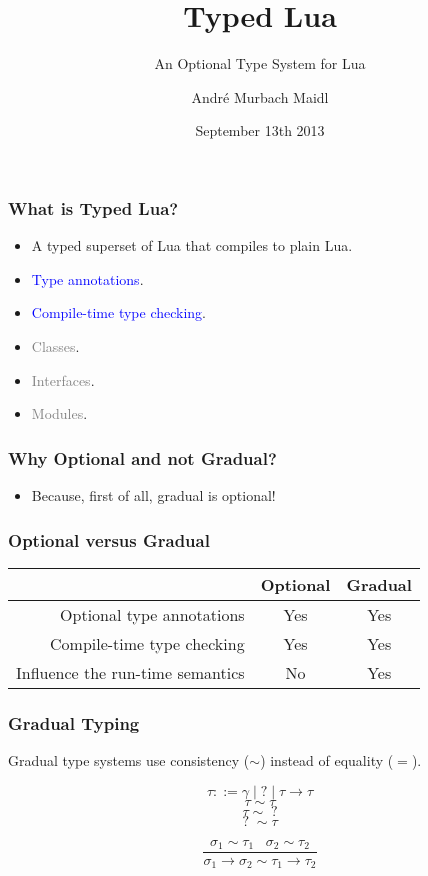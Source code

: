 \documentclass{beamer}
\begin{document}
\title{Typed Lua}
\subtitle{An Optional Type System for Lua}
\author{André Murbach Maidl}
\date{September 13th 2013}

\frame{\titlepage}

\begin{frame}
\frametitle{What is Typed Lua?}
\begin{itemize}
\item A typed superset of Lua that compiles to plain Lua.
\item \textcolor{blue}{Type annotations}.
\item \textcolor{blue}{Compile-time type checking}.
\item \textcolor{gray}{Classes}.
\item \textcolor{gray}{Interfaces}.
\item \textcolor{gray}{Modules}.
\end{itemize}
\end{frame}

\begin{frame}
\frametitle{Why Optional and not Gradual?}
\begin{itemize}
\item Because, first of all, gradual is optional!
\end{itemize}
\end{frame}

\begin{frame}
\frametitle{Optional versus Gradual}
\begin{center}
\begin{tabular}{|r|c|c|}
\hline
& Optional & Gradual\\
\hline
Optional type annotations & Yes & Yes \\ 
\hline
Compile-time type checking & Yes & Yes \\
\hline
Influence the run-time semantics & No & Yes \\
\hline
\end{tabular}
\end{center}
\end{frame}

\begin{frame}
\frametitle{Gradual Typing}
Gradual type systems use consistency ($\sim$) instead of equality ($=$).
\begin{Large}
\[
\tau ::= \gamma \;|\; ? \;|\; \tau \rightarrow \tau
\]
\[
\tau \sim \tau
\]
\[
\tau \sim \;?
\]
\[
?\; \sim \tau
\]

\[
\frac{\sigma_{1} \sim \tau_{1} \;\;\; \sigma_{2} \sim \tau_{2}}
     {\sigma_{1} \rightarrow \sigma_{2} \sim \tau_{1} \rightarrow \tau_{2}}
\]
\end{Large}
\end{frame}
\end{document}
